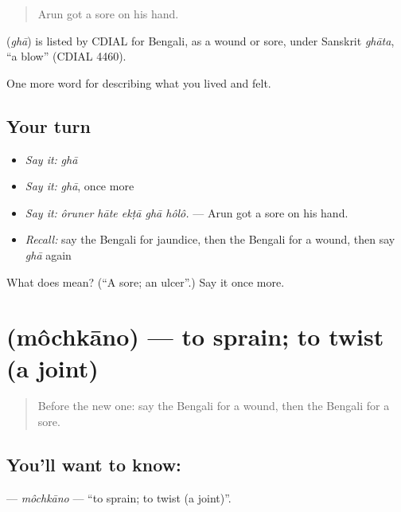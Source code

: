 \begin{quote}
Arun got a sore on his hand.
\end{quote}

\begin{cousinweb}
\textbf{} (\emph{ghā}) is listed by CDIAL for Bengali, as a wound or sore, under Sanskrit \emph{ghāta}, \textquotedblleft{}a blow\textquotedblright{} (CDIAL 4460).
\end{cousinweb}

\begin{grammarlens}[title={What you've built}]
One more word for describing what you lived and felt.
\end{grammarlens}

\subsection*{Your turn}
\begin{itemize}
\raggedright
  \item \emph{Say it:} \emph{ghā}
  \item \emph{Say it:} \emph{ghā}, once more
  \item \emph{Say it:} \emph{ôruner hāte ekṭā ghā hôlô.} — Arun got a sore on his hand.
  \item \emph{Recall:} say the Bengali for jaundice, then the Bengali for a wound, then say \emph{ghā} again
\end{itemize}

\begin{tcolorbox}[breakable,colback=teal!4,colframe=teal!35!black,title={Before you move on}]
What does  mean? (\textquotedblleft{}A sore; an ulcer\textquotedblright{}.) Say it once more.
\end{tcolorbox}
\section[\texorpdfstring{\bn{মচকানো} (môchkāno)}{মচকানো (môchkāno)}]{ (môchkāno) — to sprain; to twist (a joint)}

\label{lesson:BN-C475-mochkano}



\begin{quote}
Before the new one: say the Bengali for a wound, then the Bengali for a sore.
\end{quote}

\subsection*{You'll want to know: }
\textbf{} — \emph{môchkāno} — \textquotedblleft{}to sprain; to twist (a joint)\textquotedblright{}.

